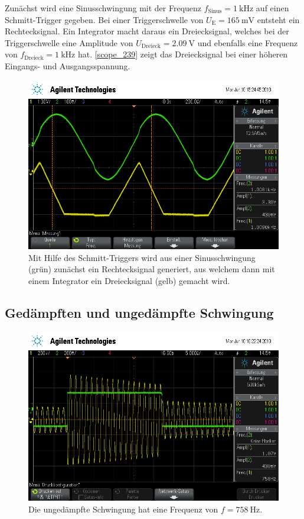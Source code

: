 Zunächst wird eine Sinusschwingung mit der Frequenz $f_\text{Sinus} = \SI{1}{\kilo\hertz}$ auf einen Schmitt-Trigger gegeben. Bei einer Triggerschwelle von $U_\text{E} = \SI{165}{\milli\volt}$ entsteht ein Rechtecksignal. Ein Integrator macht daraus ein Dreiecksignal, welches bei der Triggerschwelle eine Amplitude von $U_\text{Dreieck} = \SI{2.09}{\volt}$ und ebenfalls eine Frequenz von $f_\text{Dreieck} = \SI{1}{\kilo\hertz}$ hat. \autoref{scope_239} zeigt das Dreiecksignal bei einer höheren Eingangs- und Ausgangsspannung.
\begin{figure}[h]
	\centering
	\includegraphics[width=\textwidth]{usb/scope_239.png}
	\caption{Mit Hilfe des Schmitt-Triggers wird aus einer Sinusschwingung (grün) zunächst ein Rechtecksignal generiert, aus welchem dann mit einem Integrator ein Dreiecksignal (gelb) gemacht wird.}
	\label{scope_239}
\end{figure}

\FloatBarrier

\subsection{Ged\"{a}mpften und unged\"{a}mpfte Schwingung}

\begin{figure}[h]
	\centering
	\includegraphics[width=\textwidth]{usb/scope_241.png}
	\caption{Die ungedämpfte Schwingung hat eine Frequenz von $f = \SI{758}{\hertz}$.}
	\label{scope_241}
\end{figure}

